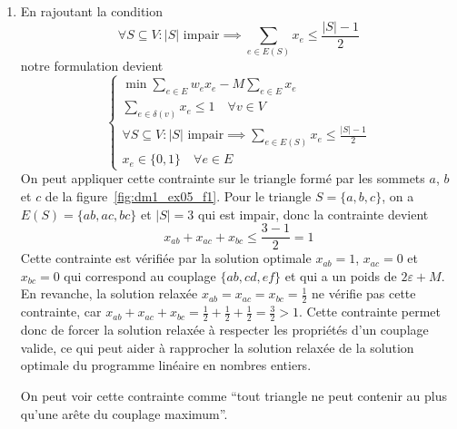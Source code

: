 {\begin{td-sol}[]
\begin{enumerate}
			\item En rajoutant la condition
			\begin{equation*}
				\forall S \subseteq V: |S| \text{ impair} \implies \sum_{e \in E(S)} x_e \leq \frac{|S|-1}{2}
			\end{equation*}
			notre formulation devient
			\begin{equation*}
				\begin{cases}
					\min \sum_{e \in E} w_e x_e - M \sum_{e \in E} x_e \\
					\sum_{e \in \delta(v)} x_e \leq 1 \quad \forall v \in V \\
					\forall S \subseteq V: |S| \text{ impair} \implies \sum_{e \in E(S)} x_e \leq \frac{|S|-1}{2} \\
					x_e \in \{0, 1\} \quad \forall e \in E
				\end{cases}
			\end{equation*}
			On peut appliquer cette contrainte sur le triangle formé par les sommets \(a\), \(b\) et \(c\) de la figure~\ref{fig:dm1_ex05_f1}.
			Pour le triangle \(S = \{a, b, c\}\), on a \(E(S) = \{ab, ac, bc\}\) et \(|S| = 3\) qui est impair, donc la contrainte devient
			\begin{equation*}
				x_{ab} + x_{ac} + x_{bc} \leq \frac{3-1}{2} = 1
			\end{equation*}
			Cette contrainte est vérifiée par la solution optimale \(x_{ab} = 1\), \(x_{ac} = 0\) et \(x_{bc} = 0\) qui correspond au couplage \(\{ab, cd, ef\}\) et qui a un poids de \(2 \varepsilon + M\).
			En revanche, la solution relaxée \(x_{ab} = x_{ac} = x_{bc} = \frac{1}{2}\) ne vérifie pas cette contrainte, car \(x_{ab} + x_{ac} + x_{bc} = \frac{1}{2} + \frac{1}{2} + \frac{1}{2} = \frac{3}{2} > 1\).
			Cette contrainte permet donc de forcer la solution relaxée à respecter les propriétés d'un couplage valide, ce qui peut aider à rapprocher la solution relaxée de la solution optimale du programme linéaire en nombres entiers.
			
			On peut voir cette contrainte comme ``tout triangle ne peut contenir au plus qu'une arête du couplage maximum''.
		\end{enumerate}
	\end{td-sol}
}{}
